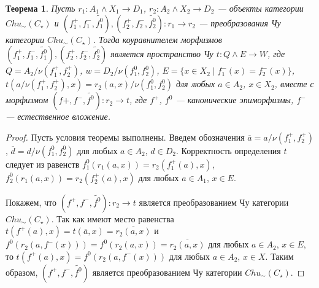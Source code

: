 \documentclass[a4paper,12pt]{article}
\newtheorem{theorem}{Теорема}
\begin{document}
\begin{theorem}
    Пусть $r_1: A_1 \wedge X_1 \to D_1$, $r_2: A_2 \wedge X_2 \to D_2$ --- объекты категории $Chu_\sim(C_\star)$ и $(f_1^+,f_1^-,\widetilde{f_1^0}), (f_2^+,f_2^-,\widetilde{f_2^0}): r_1 \to r_2$ --- преобразования Чу категории $Chu_\sim(C_\star)$. Тогда коуравнителем морфизмов $(f_1^+,f_1^-,\widetilde{f_1^0}), (f_2^+,f_2^-,\widetilde{f_2^0})$ является пространство Чу $t: Q \wedge E \to W$, где $Q = A_2/\nu(f_1^+,f_2^+)$, $w = D_2/\nu(f_1^0,f_2^0)$, $E = \{x \in X_2 \mid f_1^-(x) = f_2^-(x)\}$, $t(a/\nu(f_1^+,f_2^+),x) = r_2(a,x)/\nu(f_1^0,f_2^0)$ для любых $a \in A_2$, $x \in X_2$, вместе с морфизмом $(f+,f^-,\widetilde{f^0}): r_2 \to t$, где $f^+$, $f^0$ --- канонические эпиморфизмы, $f^-$ --- естественное вложение. 
\end{theorem}
\begin{proof}
    Пусть условия теоремы выполнены. Введем обозначения $\overline{a} = a/\nu(f_1^+,f_2^+)$, $\overline{d} = d/\nu(f_1^0,f_2^0)$ для любых $a \in A_2$, $d \in D_2$. Корректность определения $t$ следует из равенств $f_1^0(r_1(a,x)) = r_2(f_1^+(a),x)$, $f_2^0(r_1(a,x)) = r_2(f_2^+(a),x)$ для любых $a \in A_1$, $x \in E$.

    Покажем, что $(f^+,f^-,\widetilde{f^0}): r_2 \to t$ является преобразованием Чу категории $Chu_\sim(C_\star)$. Так как имеют место равенства $t(f^+(a),x) = t(\overline{a},x) = \overline{r_2(a,x)}$ и $f^0(r_2(a,f^-(x))) = f^0(r_2(a,x)) = \overline{r_2(a,x)}$ для любых $a \in A_2$, $x \in E$, то $t(f^+(a),x) = f^0(r_2(a,f^-(x)))$ для любых $a \in A_2$, $x \in X$. Таким образом, $(f^+,f^-,\widetilde{f^0})$ является преобразованием Чу категории $Chu_\sim(C_\star)$.


\end{proof}
\end{document}
